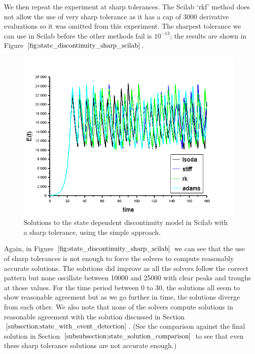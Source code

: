 We then repeat the experiment at sharp tolerances. The Scilab `rkf' method does not allow the use of very sharp tolerance as it has a cap of 3000 derivative evaluations so it was omitted from this experiment. The sharpest tolerance we can use in Scilab before the other methods fail is $10^{-13}$; the results are shown in Figure $\ref{fig:state_discontinuity_sharp_scilab}$.

\begin{figure}[H]
\centering
\includegraphics[width=0.7\linewidth]{./figures/state_discontinuity_sharp_sci}
\caption{Solutions to the state dependent discontinuity model in Scilab with a sharp tolerance, using the simple approach.}
\label{fig:state_discontinuity_sharp_scilab}
\end{figure}

Again, in Figure $\ref{fig:state_discontinuity_sharp_scilab}$ we can see that the use of sharp tolerances is not enough to force the solvers to compute reasonably accurate solutions. The solutions did improve as all the solvers follow the correct pattern but none oscillate between 10000 and 25000 with clear peaks and troughs at those values. For the time period between 0 to 30, the solutions all seem to show reasonable agreement but as we go further in time, the solutions diverge from each other. We also note that none of the solvers compute solutions in reasonable agreement with the solution discussed in Section $\ref{subsection:state_with_event_detection}$. (See the comparison against the final solution in Section $\ref{subsubsection:state_solution_comparison}$ to see that even these sharp tolerance solutions are not accurate enough.)


